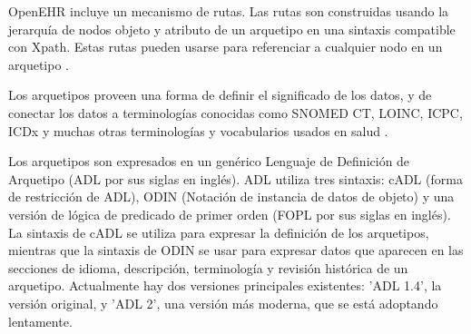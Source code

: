 OpenEHR incluye un mecanismo de rutas. Las rutas son construidas usando la jerarquía de nodos objeto y atributo de un arquetipo en una sintaxis compatible con Xpath. Estas rutas pueden usarse para referenciar a cualquier nodo en un arquetipo \cite{openEHRArchitecture}.

Los arquetipos proveen una forma de definir el significado de los datos, y de conectar los datos a terminologías conocidas como SNOMED CT, LOINC, ICPC, ICDx y muchas otras terminologías y vocabularios usados en salud \cite{openEHRArchitecture}.

Los arquetipos son expresados en un genérico Lenguaje de Definición de Arquetipo \cite{openEHRADL} (ADL por sus siglas en inglés). ADL utiliza tres sintaxis: cADL (forma de restricción de ADL), ODIN (Notación de instancia de datos de objeto) y una versión de lógica de predicado de primer orden (FOPL por sus siglas en inglés). La sintaxis de cADL se utiliza para expresar la definición de los arquetipos, mientras que la sintaxis de ODIN se usar para expresar datos que aparecen en las secciones de idioma, descripción, terminología y revisión histórica de un arquetipo. Actualmente hay dos versiones principales existentes: 'ADL 1.4', la versión original, y 'ADL 2', una versión más moderna, que se está adoptando lentamente.

